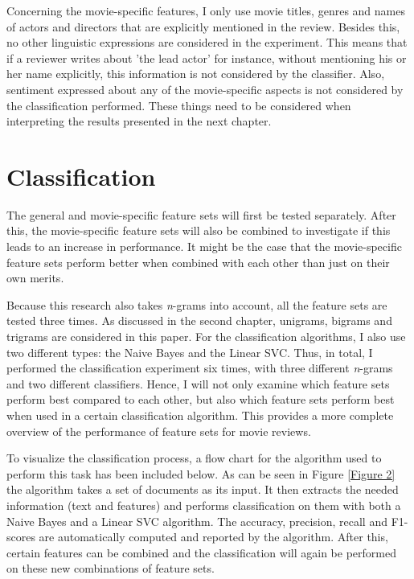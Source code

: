 \documentclass[
10pt, %
a4paper, %
oneside, %
headinclude,footinclude, %
] {book}%
\begin{document}
\newpage

Concerning the movie-specific features, I only use movie titles, genres and names of actors and directors that are explicitly mentioned in the review. Besides this, no other linguistic expressions are considered in the experiment. This means that if a reviewer writes about 'the lead actor' for instance, without mentioning his or her name explicitly, this information is not considered by the classifier. Also, sentiment expressed about any of the movie-specific aspects is not considered by the classification performed. These things need to be considered when interpreting the results presented in the next chapter.

\section{Classification}

The general and movie-specific feature sets will first be tested separately. After this, the movie-specific feature sets will also be combined to investigate if this leads to an increase in performance. It might be the case that the movie-specific feature sets perform better when combined with each other than just on their own merits. 

Because this research also takes \textit n-grams into account, all the feature sets are tested three times. As discussed in the second chapter, unigrams, bigrams and trigrams are considered in this paper. For the classification algorithms, I also use two different types: the Naive Bayes and the Linear SVC. Thus, in total, I performed the classification experiment six times, with three different \textit n-grams and two different classifiers. Hence, I will not only examine which feature sets perform best compared to each other, but also which feature sets perform best when used in a certain classification algorithm. This provides a more complete overview of the performance of feature sets for movie reviews.

To visualize the classification process, a flow chart for the algorithm used to perform this task has been included below. As can be seen in Figure \ref{Figure 2} the algorithm takes a set of documents as its input. It then extracts the needed information (text and features) and performs classification on them with both a Naive Bayes and a Linear SVC algorithm. The accuracy, precision, recall and F1-scores are automatically computed and reported by the algorithm. After this, certain features can be combined and the classification will again be performed on these new combinations of feature sets.
\end{document}
